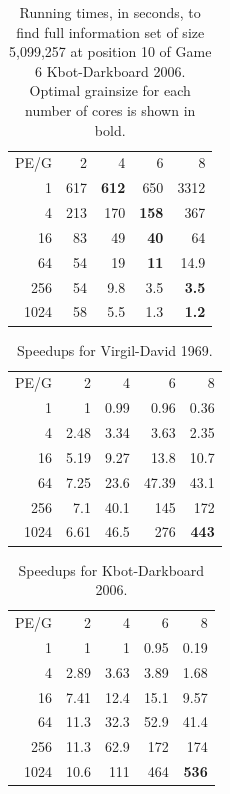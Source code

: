 \documentclass[times, 10pt,twocolumn]{article}
\begin{document}
\begin{table}[tphb]
\centering
\begin{tabular}{rrrrr}
PE/G & 2 & 4 & 6 & 8 \\
1 & 617 & {\bf 612} & 650 & 3312 \\
4 & 213 & 170 & {\bf 158} & 367 \\
16 & 83 & 49 & {\bf 40} & 64 \\
64 & 54 & 19 & {\bf 11} & 14.9 \\
256 & 54 & 9.8 & 3.5 & {\bf 3.5} \\
1024 & 58 & 5.5 & 1.3 & {\bf 1.2} \\
\end{tabular}
\caption{Running times, in seconds, to find full information set of size 5,099,257 at position 10 of Game 6 Kbot-Darkboard 2006. Optimal grainsize for each number of cores is shown in bold.}
\label{tab:prob5}
\end{table}

\begin{table}[tphb]
\centering
\begin{tabular}{rrrrr}
PE/G & 2 & 4 & 6 & 8 \\
1 & 1 & 0.99 & 0.96 & 0.36 \\ 
4 & 2.48 & 3.34 & 3.63 & 2.35 \\
16 & 5.19 & 9.27 & 13.8 & 10.7 \\
64 & 7.25 & 23.6 & 47.39 & 43.1 \\
256 & 7.1 & 40.1 & 145 & 172 \\
1024 & 6.61 & 46.5 & 276 & {\bf 443}
\end{tabular}
\caption{Speedups for Virgil-David 1969.}
\label{tab:prob4speedups}
\end{table}

\begin{table}[tphb]
\centering
\begin{tabular}{rrrrr}
PE/G & 2 & 4 & 6 & 8 \\
1 & 1 & 1 & 0.95 & 0.19 \\
4 & 2.89 & 3.63 & 3.89 & 1.68 \\
16 & 7.41 & 12.4 & 15.1 & 9.57 \\
64 & 11.3 & 32.3 & 52.9 & 41.4 \\
256 & 11.3 & 62.9 & 172 & 174 \\
1024 & 10.6 & 111 & 464 & {\bf 536}
\end{tabular}
\caption{Speedups for Kbot-Darkboard 2006.}
\label{tab:prob5speedups}
\end{table}
\end{document}
